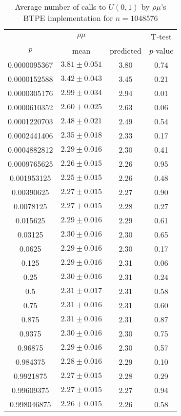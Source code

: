 \begin{table}[t]
\caption{Average number of calls to $U(0,1)$ by $\rho\mu$'s BTPE implementation for $n=1048576$}
\label{tab:calls1048576}
\begin{tabular}{cccc} \hline
    & $\rho\mu$ & & T-test \\
$p$ & mean & predicted & $p$-value \\ \hline
0.0000095367 & $3.81 \pm 0.051$ & 3.80 & 0.74 \\
0.0000152588 & $3.42 \pm 0.043$ & 3.45 & 0.21 \\
0.0000305176 & $2.99 \pm 0.034$ & 2.94 & 0.01 \\
0.0000610352 & $2.60 \pm 0.025$ & 2.63 & 0.06 \\
0.0001220703 & $2.48 \pm 0.021$ & 2.49 & 0.54 \\
0.0002441406 & $2.35 \pm 0.018$ & 2.33 & 0.17 \\
0.0004882812 & $2.29 \pm 0.016$ & 2.30 & 0.41 \\
0.0009765625 & $2.26 \pm 0.015$ & 2.26 & 0.95 \\
0.001953125  & $2.25 \pm 0.015$ & 2.26 & 0.48 \\
0.00390625   & $2.27 \pm 0.015$ & 2.27 & 0.90 \\
0.0078125    & $2.27 \pm 0.015$ & 2.28 & 0.27 \\
0.015625     & $2.29 \pm 0.016$ & 2.29 & 0.61 \\
0.03125      & $2.30 \pm 0.016$ & 2.30 & 0.65 \\
0.0625       & $2.29 \pm 0.016$ & 2.30 & 0.17 \\
0.125        & $2.29 \pm 0.016$ & 2.31 & 0.06 \\
0.25         & $2.30 \pm 0.016$ & 2.31 & 0.24 \\
0.5          & $2.31 \pm 0.017$ & 2.31 & 0.58 \\
0.75         & $2.31 \pm 0.016$ & 2.31 & 0.60 \\
0.875        & $2.31 \pm 0.016$ & 2.31 & 0.87 \\
0.9375       & $2.30 \pm 0.016$ & 2.30 & 0.75 \\
0.96875      & $2.29 \pm 0.016$ & 2.30 & 0.57 \\
0.984375     & $2.28 \pm 0.016$ & 2.29 & 0.10 \\
0.9921875    & $2.27 \pm 0.015$ & 2.28 & 0.29 \\
0.99609375   & $2.27 \pm 0.015$ & 2.27 & 0.94 \\
0.998046875  & $2.26 \pm 0.015$ & 2.26 & 0.58 \\

\end{tabular}
\end{table}
